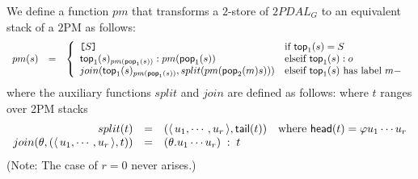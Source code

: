 We define a function $pm$ that transforms a $2$-store of $2PDAL_G$
to an equivalent stack of a $2$PM as follows:
\[\begin{array}{rlll}
pm(s) & = &
\left \{
\begin{array}{ll}
{\hbox{\tt [}{S}\hbox{\tt ]}} & \mbox{if } {\sf top}_1(s) = S\\
{\sf top}_1(s)_{pm({\sf pop}_1(s))} : pm({\sf pop}_1(s)) & \mbox{elseif } {\sf top}_1(s) : o\\
join({{\sf top}_1(s)_{pm({\sf pop}_1(s))}}, split(pm({\sf pop}_2(m)s))) &
\hbox{elseif ${\sf top}_1(s)$ has label $m{-}$}\\

\end{array}
\right .\\
\end{array}\]
where the auxiliary functions $split$ and $join$ are defined as
follows: where $t$ ranges over 2PM stacks
\[\begin{array}{rlll}
split(t) & = & (\langle\,{u_1, \cdots, u_r}\,\rangle, {\sf tail}(t)) &
\hbox{where ${\sf head}(t) = \varphi u_1 \cdots u_r$} \\
join(\theta, (\langle\,{u_1, \cdots, u_r}\,\rangle, t)) & = & (\theta . u_1
\cdots u_r) \; : \; t \\
\end{array}\]
(Note: The case of $r = 0$ never arises.)



